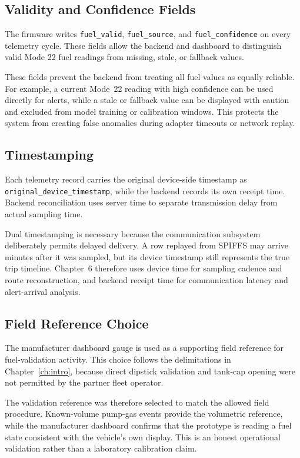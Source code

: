 \subsection{Validity and Confidence Fields}
The firmware writes \texttt{fuel\_valid}, \texttt{fuel\_source}, and \texttt{fuel\_confidence} on every telemetry cycle. These fields allow the backend and dashboard to distinguish valid Mode 22 fuel readings from missing, stale, or fallback values.

These fields prevent the backend from treating all fuel values as equally reliable. For example, a current Mode~22 reading with high confidence can be used directly for alerts, while a stale or fallback value can be displayed with caution and excluded from model training or calibration windows. This protects the system from creating false anomalies during adapter timeouts or network replay.

\subsection{Timestamping}
Each telemetry record carries the original device-side timestamp as \texttt{original\_device\_\allowbreak timestamp}, while the backend records its own receipt time. Backend reconciliation uses server time to separate transmission delay from actual sampling time.

Dual timestamping is necessary because the communication subsystem deliberately permits delayed delivery. A row replayed from SPIFFS may arrive minutes after it was sampled, but its device timestamp still represents the true trip timeline. Chapter~6 therefore uses device time for sampling cadence and route reconstruction, and backend receipt time for communication latency and alert-arrival analysis.

\subsection{Field Reference Choice}
The manufacturer dashboard gauge is used as a supporting field reference for fuel-validation activity. This choice follows the delimitations in Chapter~\ref{ch:intro}, because direct dipstick validation and tank-cap opening were not permitted by the partner fleet operator.

The validation reference was therefore selected to match the allowed field procedure. Known-volume pump-gas events provide the volumetric reference, while the manufacturer dashboard confirms that the prototype is reading a fuel state consistent with the vehicle's own display. This is an honest operational validation rather than a laboratory calibration claim.


